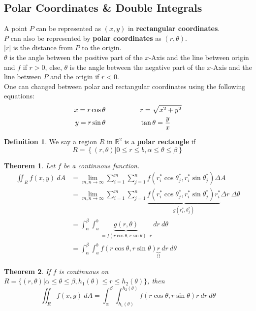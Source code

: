\documentclass[12 pt]{article}
\newtheorem{thm}{Theorem}
\theoremstyle{definition}
\newtheorem{defn}{Definition}
\begin{document}
\subsection{Polar Coordinates \& Double Integrals}
A point $P$ can be represented as $(x,y)$ in \textbf{rectangular coordinates}.
\\ $P$ can also be represented by \textbf{polar coordinates} as $(r,\theta)$.
\\ $|r|$ is the distance from $P$ to the origin.
\\ $\theta$ is the angle between the positive part of the $x$-Axis and the line between origin and $f$ if $r>0$, else, $\theta$ is the angle between the negative part of the $x$-Axis and the line between $P$ and the origin if $r<0$.
\\ One can changed between polar and rectangular coordinates using the following equations:
\begin{align*}
  x=r \cos \theta \hspace{50 pt}& r=\sqrt{x^2+y^2}
  \\y=r\sin \theta \hspace{50 pt}& \tan \theta = \frac{y}{x}
\end{align*}
\begin{defn}
  We say a region $R$ in $\mathbb{R}^2$ is a \textbf{polar rectangle} if
  $$ R=\left\{(r,\theta)|0\leq r \leq b, \alpha \leq \theta \leq \beta \right\}$$
\end{defn}
\begin{thm}
  Let $f$ be a continuous function.
  \begin{align*}
    \iint_{R}f(x,y)\ dA & = \lim_{m,n\to \infty}\sum_{i=1}^{m}\sum_{j=1}^nf(r_i^* \cos \theta_j^*,r_i^* \sin\theta_j^*)\Delta A
    \\&=\lim_{m,n\to \infty}\sum_{i=1}^{m}\sum_{j=1}^n \underbrace{f(r_i^* \cos \theta_j^*,r_i^* \sin \theta_j^*)r_i^*}_{g(r_i^*,\theta_j^*)} \Delta r \ \Delta \theta
    \\&= \int_{\alpha}^{\beta}\int_{a}^{b}\underbrace{g(r,\theta)}_{=f(r\cos \theta,r\sin \theta)\cdot r}\ dr \ d\theta
    \\&=\int_{\alpha}^{\beta}\int_a^b f(r \cos \theta,r \sin \theta)\underbrace{r}_{!!}\ dr \ d\theta
  \end{align*}
\end{thm}
\begin{thm}
  If $f$ is continuous on $R=\{(r,\theta)|\alpha\leq \theta \leq \beta,h_1(\theta)\leq r \leq h_2(\theta)\}$, then
  $$\iint_R f(x,y)\ dA = \int_{\alpha}^{\beta}\int_{h_1(\theta)}^{h_2(\theta)}f(r \cos \theta, r \sin \theta)r \ dr \ d\theta$$
\end{thm}
\end{document}
